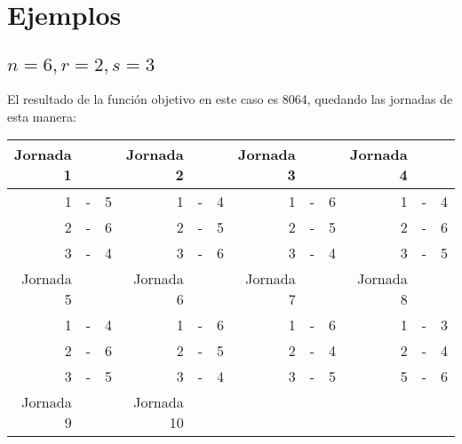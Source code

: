 \documentclass[12pt,a4paper,table]{article}
\theoremstyle{break}
\begin{document}
\section{Ejemplos}
\subsection{$n = 6, r =  2, s = 3$}
El resultado de la función objetivo en este caso es 8064, quedando las jornadas de
esta  manera:

\begin{center}\begin{tabular}[]{|rcl|rcl|rcl|rcl|}
	\hline
	\rowcolor{gray!50} Jornada 1 & \hspace{1em} & \hspace{1em} &
	Jornada 2 & \hspace{1em} & \hspace{1em} &
	Jornada 3 & \hspace{1em} & \hspace{1em} &
	Jornada 4 & \hspace{1em} & \hspace{1em} \\ \hline
	1 & - & 5  &  1 & - & 4  &  1 & - & 6  &  1 & - & 4 \\ \hline
	2 & - & 6  &  2 & - & 5  &  2 & - & 5  &  2 & - & 6 \\ \hline
	3 & - & 4  &  3 & - & 6  &  3 & - & 4  &  3 & - & 5 \\ \hline
	\rowcolor{gray!50} Jornada 5 & \hspace{1em} & \hspace{1em} &
	Jornada 6 & \hspace{1em} & \hspace{1em} &
	Jornada 7 & \hspace{1em} & \hspace{1em} &
	Jornada 8 & \hspace{1em} & \hspace{1em} \\ \hline
	1 & - & 4  &  1 & - & 6  &  1 & - & 6  &  1 & - & 3 \\ \hline
	2 & - & 6  &  2 & - & 5  &  2 & - & 4  &  2 & - & 4 \\ \hline
	3 & - & 5  &  3 & - & 4  &  3 & - & 5  &  5 & - & 6\\ \hline
	\rowcolor{gray!50} Jornada 9 & \hspace{1em} & \hspace{1em} &
	Jornada 10 & \hspace{1em} & \hspace{1em} &

\end{tabular}
\end{center}
\end{document}
